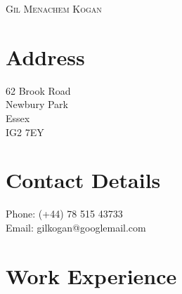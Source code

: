 \documentclass[a4paper]{article}
\begin{document}
\pagestyle{empty}

\begin{center}
\LARGE{\textsc{Gil Menachem Kogan}}
\end{center}
\begin{multicols}{2}
\section{Address}
\begin{flushleft}
  62 Brook Road \\
  Newbury Park \\
  Essex  \\
  IG2 7EY \\

\end{flushleft}
\section{Contact Details}
\begin{flushleft}
  
  Phone: (+44) 78 515 43733 \\
  Email: gilkogan@googlemail.com
  \newline 
  \newline 
\end{flushleft}
\end{multicols}

\section{Work Experience}
\end{document}
